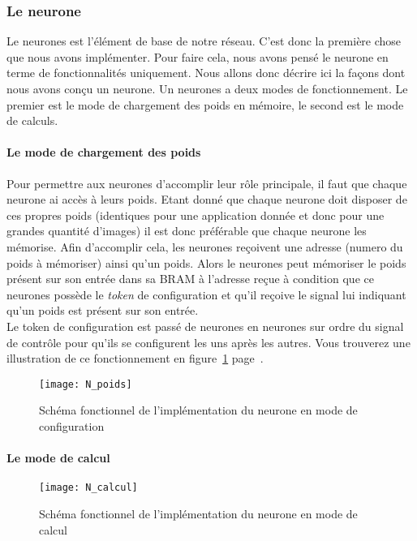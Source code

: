\subsubsection{Le neurone}
	Le neurones est l'élément de base de notre réseau.
	C'est donc la première chose que nous avons implémenter.
	Pour faire cela, nous avons pensé le neurone en terme de
	fonctionnalités uniquement.
	Nous allons donc décrire ici la façons dont nous avons conçu un neurone. 
	Un neurones a deux modes de fonctionnement.
	Le premier est le mode de chargement des poids en mémoire, le second
	est le mode de calculs.

	\paragraph{Le mode de chargement des poids\\}
	
	Pour permettre aux neurones d'accomplir leur rôle principale, il faut que chaque neurone ai
	accès à leurs poids. Etant donné que chaque neurone doit disposer de ces propres poids
	(identiques pour une application donnée et donc pour une grandes quantité d'images)
	il est donc préférable que chaque neurone les mémorise. Afin d'accomplir cela,
	les neurones reçoivent une adresse (numero du poids à mémoriser) ainsi qu'un poids.
	Alors le neurones peut mémoriser le poids présent sur son entrée dans
	sa BRAM à l'adresse reçue à condition que ce neurones possède le {\em token} de
	configuration et qu'il reçoive le signal lui indiquant qu'un poids est présent sur son entrée.\\
	Le token de configuration est passé de neurones en neurones
	sur ordre du signal de contrôle pour qu'ils se configurent les uns après les autres.
	Vous trouverez une illustration de ce fonctionnement en
	figure~\ref{fig:N_poids} page~\pageref{fig:N_poids}.
	\begin{figure}[h!]
		\begin{center}
			\texttt{[image: N\_poids]}
			\caption{Schéma fonctionnel de l'implémentation du neurone en mode de configuration}
			\label{fig:N_poids}
		\end{center}
	\end{figure}

	\paragraph{Le mode de calcul\\}
	\begin{figure}[h!]
		\begin{center}
			\texttt{[image: N\_calcul]}
			\caption{Schéma fonctionnel de l'implémentation du neurone en mode de calcul}
			\label{fig:N_calcul}
		\end{center}
	\end{figure}
	
